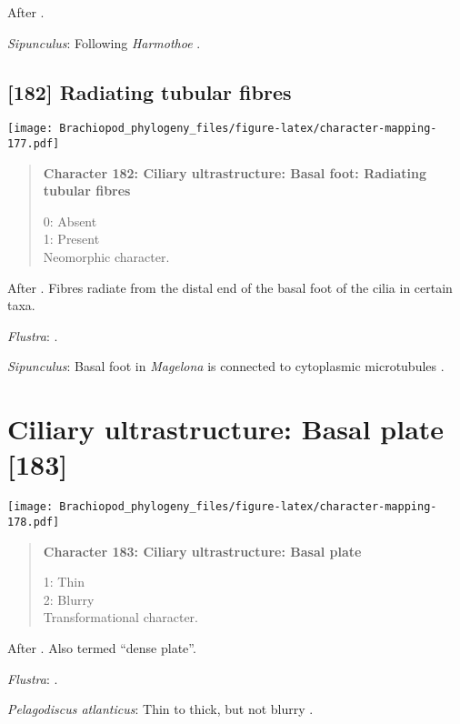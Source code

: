 \documentclass[openany]{book}
\theoremstyle{definition}
\theoremstyle{definition}
\theoremstyle{definition}
\theoremstyle{remark}
\begin{document}
After \citet{Lundin2009}.

\hypertarget{Sipunculus-coding-181}{}
\emph{Sipunculus}: Following \emph{Harmothoe} \citep{Holborow1969}.

\subsection*{{[}182{]} Radiating tubular
fibres}\label{radiating-tubular-fibres}

\texttt{[image: Brachiopod\_phylogeny\_files/figure-latex/character-mapping-177.pdf]}

\begin{quote}
\textbf{Character 182: Ciliary ultrastructure: Basal foot: Radiating
tubular fibres}

0: Absent\\
1: Present\\
Neomorphic character.
\end{quote}

After \citet{Lundin2009}. Fibres radiate from the distal end of the
basal foot of the cilia in certain taxa.

\hypertarget{Flustra-coding-182}{}
\emph{Flustra}: \citet{Reed1982}.

\hypertarget{Sipunculus-coding-182}{}
\emph{Sipunculus}: Basal foot in \emph{Magelona} is connected to
cytoplasmic microtubules \citep{Bartolomaeus1995}.

\section{Ciliary ultrastructure: Basal plate
{[}183{]}}\label{ciliary-ultrastructure-basal-plate-183}

\texttt{[image: Brachiopod\_phylogeny\_files/figure-latex/character-mapping-178.pdf]}

\begin{quote}
\textbf{Character 183: Ciliary ultrastructure: Basal plate}

1: Thin\\
2: Blurry\\
Transformational character.
\end{quote}

After \citet{Lundin2009}. Also termed ``dense plate''.

\hypertarget{Flustra-coding-183}{}
\emph{Flustra}: \citet{Reed1982}.

\hypertarget{Pelagodiscus_atlanticus-coding-183}{}
\emph{Pelagodiscus atlanticus}: Thin to thick, but not blurry
\citep{Luter1995}.
\end{document}

